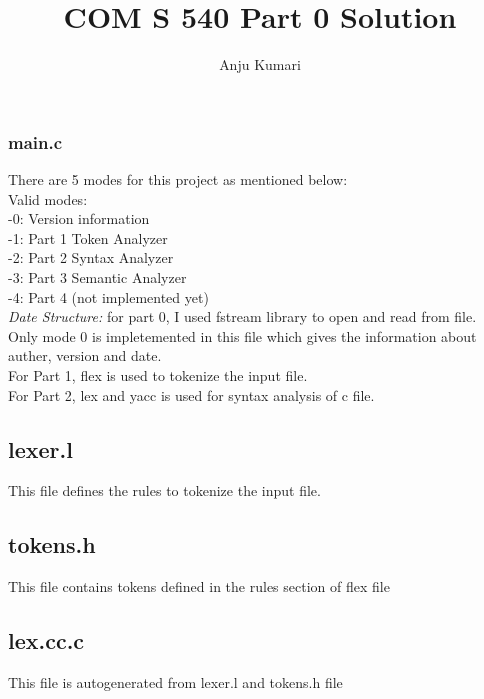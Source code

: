\documentclass{article}
\title{COM S 540 Part 0 Solution}
\author{Anju Kumari}
\date{}
\begin{document}
   

\maketitle
\section*{}

\subsubsection*{main.c}
There are 5 modes for this project as mentioned below: \\
Valid modes: \\
-0: Version information \\
-1: Part 1 Token Analyzer \\
-2: Part 2 Syntax Analyzer\\
-3: Part 3 Semantic Analyzer \\
-4: Part 4 (not implemented yet) \\

{\it Date Structure:} for part 0, I used fstream library to open and read from file. \\
Only mode 0 is impletemented in this file which gives the information about auther, version and date. \\
For Part 1, flex is used to tokenize the input file. \\
For Part 2, lex and yacc is used for syntax analysis of c file. \\

\subsection*{lexer.l}
This file defines the rules to tokenize the input file.

\subsection*{tokens.h}
This file contains tokens defined in the rules section of flex file\\

\subsection*{lex.cc.c}
This file is autogenerated from lexer.l and tokens.h file \\
\end{document}
